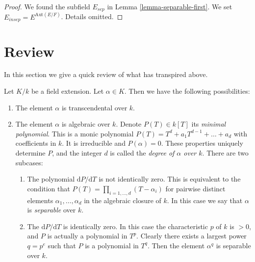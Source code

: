 \begin{proof}
We found the subfield $E_{sep}$ in Lemma \ref{lemma-separable-first}.
We set $E_{insep} = E^{\text{Aut}(E/F)}$. Details omitted.
\end{proof}









\section{Review}
\label{section-algebraic}

\noindent
In this section we give a quick review of what has transpired above.

\medskip\noindent
Let $K/k$ be a field extension. Let $\alpha \in K$. Then we have the
following possibilities:
\begin{enumerate}
\item The element $\alpha$ is transcendental over $k$.
\item The element $\alpha$ is algebraic over $k$. Denote
$P(T) \in k[T]$ its {\it minimal polynomial}. This is a monic polynomial
$P(T) = T^d + a_1 T^{d - 1} + \ldots + a_d$ with coefficients in
$k$. It is irreducible and $P(\alpha) = 0$. These properties
uniquely determine $P$, and the integer $d$ is called the
{\it degree of $\alpha$ over $k$}. There are two subcases:
\begin{enumerate}
\item The polynomial $\text{d}P/\text{d}T$ is not identically zero.
This is equivalent to the condition that
$P(T) = \prod_{i = 1, \ldots, d} (T - \alpha_i)$ for
pairwise distinct elements $\alpha_1, \ldots, \alpha_d$
in the algebraic closure of $k$.
In this case we say that $\alpha$ is {\it separable} over $k$.
\item The $\text{d}P/\text{d}T$ is identically zero. In this case the
characteristic $p$ of $k$ is $ > 0$, and $P$ is actually a polynomial
in $T^p$. Clearly there exists a largest power $q = p^e$ such that $P$ is
a polynomial in $T^q$. Then the element $\alpha^q$ is separable over $k$.
\end{enumerate}
\end{enumerate}

